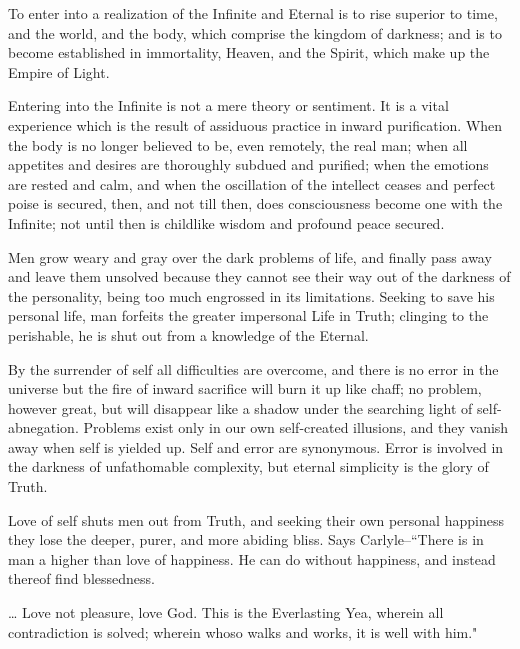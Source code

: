 \documentclass[12pt,oneside]{scrbook}
\begin{document}
  To enter into a realization of the Infinite and Eternal is to rise
  superior to time, and the world, and the body, which comprise the
  kingdom of darkness; and is to become established in immortality,
  Heaven, and the Spirit, which make up the Empire of Light.
  
  Entering into the Infinite is not a mere theory or sentiment. It is a
  vital experience which is the result of assiduous practice in inward
  purification. When the body is no longer believed to be, even remotely,
  the real man; when all appetites and desires are thoroughly subdued and
  purified; when the emotions are rested and calm, and when the
  oscillation of the intellect ceases and perfect poise is secured, then,
  and not till then, does consciousness become one with the Infinite; not
  until then is childlike wisdom and profound peace secured.
  
  Men grow weary and gray over the dark problems of life, and finally pass
  away and leave them unsolved because they cannot see their way out of
  the darkness of the personality, being too much engrossed in its
  limitations. Seeking to save his personal life, man forfeits the greater
  impersonal Life in Truth; clinging to the perishable, he is shut out
  from a knowledge of the Eternal.
  
  By the surrender of self all difficulties are overcome, and there is no
  error in the universe but the fire of inward sacrifice will burn it up
  like chaff; no problem, however great, but will disappear like a shadow
  under the searching light of self-abnegation. Problems exist only in our
  own self-created illusions, and they vanish away when self is yielded
  up. Self and error are synonymous. Error is involved in the darkness of
  unfathomable complexity, but eternal simplicity is the glory of Truth.
  
  Love of self shuts men out from Truth, and seeking their own personal
  happiness they lose the deeper, purer, and more abiding bliss. Says
  Carlyle--``There is in man a higher than love of happiness. He can do
  without happiness, and instead thereof find blessedness.
  
  \ldots{} Love not pleasure, love God. This is the Everlasting Yea,
  wherein all contradiction is solved; wherein whoso walks and works, it
  is well with him."
  
\end{document}
